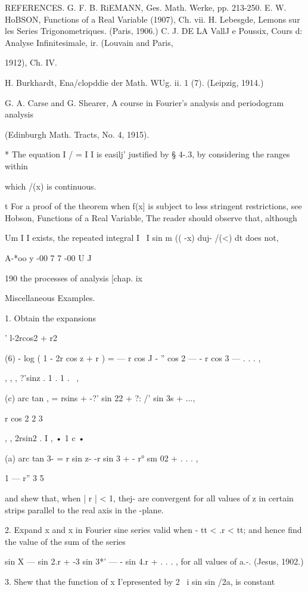 {REFERENCES. G. F. B. RiEMANN, Ges. Math. Werke, pp. 213-250. E. W.
HoBSON, Functions of a Real Variable (1907), Ch. vii. H. Lebesgde,
Lemons sur les Series Trigonometriques. (Paris, 1906.) C. J. DE LA
VallJ e Poussix, Cours d: Analyse Infinitesimale, ir. (Louvain and
Paris,

1912), Ch. IV.

H. Burkhardt, Ena/clopddie der Math. WUg. ii. 1 (7). (Leipzig, 1914.)

G. A. Carse and G. Shearer, A course in Fourier's analysis and
periodogram analysis

(Edinburgh Math. Tracts, No. 4, 1915).

* The equation I / = I I is easilj' justified by § 4-.3, by
considering the ranges within

which /(x) is continuous.

t For a proof of the theorem when f(x] is subject to less stringent
restrictions, see Hobson, Functions of a Real Variable, %
The reader should observe that, although

Um I I exists, the repeated integral I \ I sin m (( -x) duj- /(<) dt
does not,

A-*oo y -00 7 7 -00 U J

190 the processes of analysis [chap. ix

Miscellaneous Examples.

1. Obtain the expansions

  ' l-2rcos2 + r2

(6) - log ( 1 - 2r cos z + r ) = — r cos J - '' cos 2 — - r cos 3 — .
. . ,

, , , ?'sinz . 1 . 1 . \ ,

(c) arc tan , = rsins + -?' sin 22 + ?: /' sin 3s + ...,

   r cos 2 2 3

, , 2rsin2 . I , • 1 c •

(a) arc tan 3- = r sin z- -r sin 3 + - r° sm 02 + . . . ,

1 — r'' 3 5

and shew that, when | r | < 1, thej- are convergent for all values of
z in certain strips parallel to the real axis in the -plane.

2. Expand x and x in Fourier sine series valid when - tt < .r < tt;
and hence find the value of the sum of the series

sin X — sin 2.r + -3 sin 3*' — - sin 4.r + . . . , for all values of
a.-. (Jesus, 1902.)

3. Shew that the function of x I'epresented by 2 ~i sin sin /2a, is
constant

}
